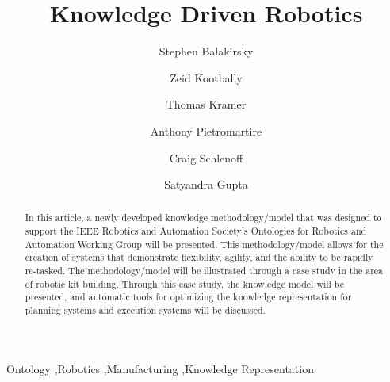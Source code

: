 \documentclass[preprint,12pt]{elsarticle}
\begin{document}
\begin{frontmatter}



\title{Knowledge Driven Robotics}


\author[NIST]{Stephen Balakirsky}
\author[NIST,UMD]{Zeid Kootbally}
\author[CATHU,NIST]{Thomas Kramer}
\author[NIST]{Anthony Pietromartire}
\author[NIST]{Craig Schlenoff}
\author[UMD]{Satyandra Gupta}

\address[CATHU]{Catholic University of America, Washington, DC, USA}
\address[NIST]{National Institute of Standards and Technology, Gaithersburg, MD USA}
\address[UMD]{University of Maryland, College Park, MD, USA}

\begin{abstract}
In this article,  a newly developed knowledge methodology/model that was designed to support 
the IEEE Robotics and Automation Society's Ontologies for Robotics and Automation Working Group
will be presented. This methodology/model allows for the creation of systems that 
demonstrate flexibility, agility, and the ability to be rapidly re-tasked. 
The methodology/model will be illustrated through a case study in the area of robotic kit building.
Through this case study, the knowledge model will be presented, and automatic
tools for optimizing the knowledge representation for planning systems and execution
systems will be discussed.
\end{abstract}

\begin{keyword}
Ontology \sep Robotics \sep Manufacturing \sep Knowledge Representation


\end{keyword}

\end{frontmatter}
\end{document}

